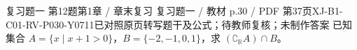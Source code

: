 \par\noindent\begin{minipage}{\linewidth}
\begin{bankitem}{复习题一 第12题}{第1章 / 章末复习 复习题一 / 教材 p.30 / PDF 第37页}{XJ-B1-C01-RV-P030-Y0711}{已对照原页转写题干及公式；待教师复核；未制作答案}
已知集合 $A=\{x\mid x+1>0\}$，$B=\{-2,-1,0,1\}$，求 $(\complement_{\mathbb R}A)\cap B$。
\end{bankitem}
\end{minipage}\par\medskip
